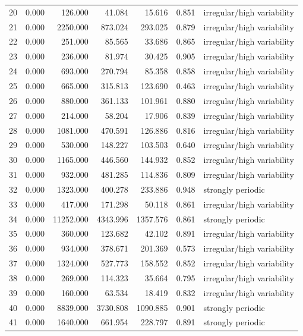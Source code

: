 \begin{longtable}{lrrrrrl}
20 & 0.000 & 126.000 & 41.084 & 15.616 & 0.851 & irregular/high variability \\
21 & 0.000 & 2250.000 & 873.024 & 293.025 & 0.879 & irregular/high variability \\
22 & 0.000 & 251.000 & 85.565 & 33.686 & 0.865 & irregular/high variability \\
23 & 0.000 & 236.000 & 81.974 & 30.425 & 0.905 & irregular/high variability \\
24 & 0.000 & 693.000 & 270.794 & 85.358 & 0.858 & irregular/high variability \\
25 & 0.000 & 665.000 & 315.813 & 123.690 & 0.463 & irregular/high variability \\
26 & 0.000 & 880.000 & 361.133 & 101.961 & 0.880 & irregular/high variability \\
27 & 0.000 & 214.000 & 58.204 & 17.906 & 0.839 & irregular/high variability \\
28 & 0.000 & 1081.000 & 470.591 & 126.886 & 0.816 & irregular/high variability \\
29 & 0.000 & 530.000 & 148.227 & 103.503 & 0.640 & irregular/high variability \\
30 & 0.000 & 1165.000 & 446.560 & 144.932 & 0.852 & irregular/high variability \\
31 & 0.000 & 932.000 & 481.285 & 114.836 & 0.809 & irregular/high variability \\
32 & 0.000 & 1323.000 & 400.278 & 233.886 & 0.948 & strongly periodic \\
33 & 0.000 & 417.000 & 171.298 & 50.118 & 0.861 & irregular/high variability \\
34 & 0.000 & 11252.000 & 4343.996 & 1357.576 & 0.861 & strongly periodic \\
35 & 0.000 & 360.000 & 123.682 & 42.102 & 0.891 & irregular/high variability \\
36 & 0.000 & 934.000 & 378.671 & 201.369 & 0.573 & irregular/high variability \\
37 & 0.000 & 1324.000 & 527.773 & 158.552 & 0.852 & irregular/high variability \\
38 & 0.000 & 269.000 & 114.323 & 35.664 & 0.795 & irregular/high variability \\
39 & 0.000 & 160.000 & 63.534 & 18.419 & 0.832 & irregular/high variability \\
40 & 0.000 & 8839.000 & 3730.808 & 1090.885 & 0.901 & strongly periodic \\
41 & 0.000 & 1640.000 & 661.954 & 228.797 & 0.891 & strongly periodic \\

\end{longtable}
